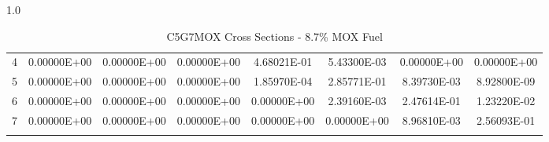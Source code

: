 \begin{sidewaysfigure}
\begin{table}[H]
\begin{subtable}[h]{1.0\textwidth}
{\begin{tabular}{*8c}
4 &	0.00000E+00 &	0.00000E+00 &	0.00000E+00	& 4.68021E-01	& 5.43300E-03	& 0.00000E+00	& 0.00000E+00 \\
5 &	0.00000E+00 &	0.00000E+00 &	0.00000E+00	& 1.85970E-04	& 2.85771E-01	& 8.39730E-03	& 8.92800E-09 \\
6 &	0.00000E+00 &	0.00000E+00 &	0.00000E+00	& 0.00000E+00	& 2.39160E-03	& 2.47614E-01	& 1.23220E-02 \\
7 &	0.00000E+00 &	0.00000E+00 &	0.00000E+00	& 0.00000E+00	& 0.00000E+00	& 8.96810E-03	& 2.56093E-01 \\
        \bottomrule
        & & & & & & & 
    \end{tabular}}
  \end{subtable}
  \caption{C5G7MOX Cross Sections - 8.7\% MOX Fuel}
          \label{table:MOX-87}
\end{table}
\end{sidewaysfigure}

